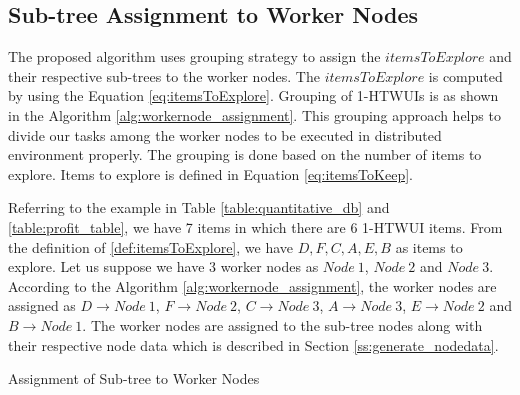 \documentclass[11pt,openright]{report}
\begin{document}
\subsection{Sub-tree Assignment to Worker Nodes} \label{ss:sub-tree-to-workernodes}
The proposed algorithm uses grouping strategy to assign the $itemsToExplore$ and their respective sub-trees to the worker nodes. The $itemsToExplore$ is computed by using the Equation \ref{eq:itemsToExplore}. Grouping of 1-HTWUIs is as shown in the Algorithm \ref{alg:workernode_assignment}. This grouping approach helps to divide our tasks among the worker nodes to be executed in distributed environment properly. The grouping is done based on the number of items to explore. Items to explore is defined in Equation \ref{eq:itemsToKeep}.

Referring to the example in Table \ref{table:quantitative_db} and \ref{table:profit_table}, we have 7 items in which there are 6 1-HTWUI items. From the definition of \ref{def:itemsToExplore}, we have $D, F, C, A, E, B$ as items to explore. Let us suppose we have 3 worker nodes as $Node\ 1$, $Node\ 2$ and $Node\ 3$. According to the Algorithm \ref{alg:workernode_assignment}, the worker nodes are assigned as $D \rightarrow Node\ 1$, $F \rightarrow Node\ 2$, $C \rightarrow Node\ 3$, $A \rightarrow Node\ 3$, $E \rightarrow Node\ 2$ and $B \rightarrow Node\ 1$. The worker nodes are assigned to the sub-tree nodes along with their respective node data which is described in Section \ref{ss:generate_nodedata}.
{\SetAlgoNoLine
	\begin{algorithm}
		
		
		\caption{Assignment of Sub-tree to Worker Nodes}           
		\label{alg:workernode_assignment}
	\end{algorithm}
}
\end{document}
